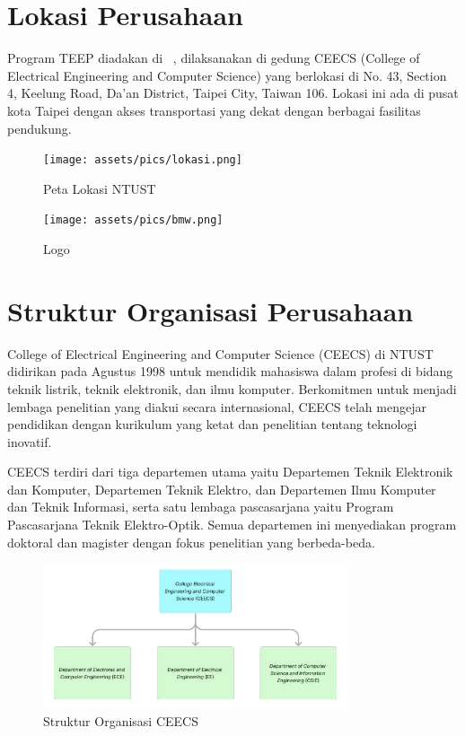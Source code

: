 \section{Lokasi Perusahaan}

Program TEEP diadakan di \namaUniv \ , dilaksanakan di gedung CEECS (College of Electrical Engineering and Computer Science) yang berlokasi di No. 43, Section 4, Keelung Road, Da'an District, Taipei City, Taiwan 106. Lokasi ini ada di pusat kota Taipei dengan akses transportasi yang dekat dengan berbagai fasilitas pendukung.

\begin{figure}[H]
    \centering
    \texttt{[image: assets/pics/lokasi.png]}
    \caption{Peta Lokasi NTUST}
    \label{fig:lokasi_ntust}
\end{figure}

\begin{figure}[H]
    \centering
    \texttt{[image: assets/pics/bmw.png]}
    \caption{Logo \namaLab}
    \label{fig:logo_bmw}
\end{figure}

\section{Struktur Organisasi Perusahaan}

College of Electrical Engineering and Computer Science (CEECS) di NTUST didirikan pada Agustus 1998 untuk mendidik mahasiswa dalam profesi di bidang teknik listrik, teknik elektronik, dan ilmu komputer. Berkomitmen untuk menjadi lembaga penelitian yang diakui secara internasional, CEECS telah mengejar pendidikan dengan kurikulum yang ketat dan penelitian tentang teknologi inovatif.

CEECS terdiri dari tiga departemen utama yaitu Departemen Teknik Elektronik dan Komputer, Departemen Teknik Elektro, dan Departemen Ilmu Komputer dan Teknik Informasi, serta satu lembaga pascasarjana yaitu Program Pascasarjana Teknik Elektro-Optik. Semua departemen ini menyediakan program doktoral dan magister dengan fokus penelitian yang berbeda-beda.

\begin{figure}[H]
    \centering
    \includegraphics[width=0.8\textwidth]{assets/pics/ceecs.png}
    \caption{Struktur Organisasi CEECS}
    \label{fig:struktur_ceecs}
\end{figure}


